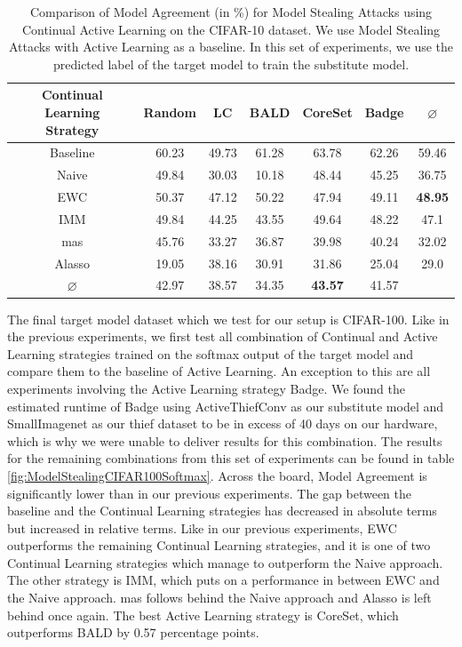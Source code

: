\begin{table}[h]
    \centering
    \begin{tabular}{c | c c c c c | c} 
        \hline
        \diagbox[width=11em]{Active \\ Learning Strategy}{Continual Learning \\ Strategy} & Random & LC & BALD & CoreSet & Badge & $\varnothing$\\ 
        \hline 
        Baseline & 60.23 & 49.73 & 61.28 & 63.78 & 62.26 & 59.46\\
        \hline
        Naive & 49.84 & 30.03 & 10.18 & 48.44 & 45.25 & 36.75\\
        EWC & 50.37 & 47.12 & 50.22 & 47.94 & 49.11 & \textbf{48.95} \\
        IMM & 49.84 & 44.25 & 43.55 & 49.64 & 48.22 & 47.1\\
        \gls{mas} & 45.76 & 33.27 & 36.87 & 39.98 & 40.24 & 32.02\\
        Alasso & 19.05 & 38.16 & 30.91 & 31.86 & 25.04 & 29.0\\
        \hline
        $\varnothing$ & 42.97 & 38.57 & 34.35 & \textbf{43.57} & 41.57\\
        \hline
    \end{tabular}
    \caption{Comparison of Model Agreement (in \%) for Model Stealing Attacks using Continual Active Learning on the CIFAR-10 dataset. We use Model Stealing Attacks with Active Learning as a baseline. In this set of experiments,
    we use the predicted label of the target model to train the substitute model.}
    \label{fig:ModelStealingCIFAR10Label}
\end{table}

The final target model dataset which we test for our setup is CIFAR-100. Like in the previous experiments, we first test all combination of Continual and Active Learning strategies trained on the softmax output of the target model
and compare them to the baseline of Active Learning. An exception to this are all experiments involving the Active Learning strategy Badge. We found the estimated runtime of Badge using ActiveThiefConv as our substitute model and SmallImagenet as our thief dataset
to be in excess of 40 days on our hardware, which is why we were unable to deliver results for this combination. The results for the remaining combinations from this set of experiments can be found in table \ref{fig:ModelStealingCIFAR100Softmax}.
Across the board, Model Agreement is significantly lower than in our previous experiments. The gap between the baseline and the Continual Learning strategies has decreased in absolute terms but increased in relative terms. Like in our previous experiments, EWC outperforms
the remaining Continual Learning strategies, and it is one of two Continual Learning strategies which manage to outperform the Naive approach. The other strategy is IMM, which puts on a performance in between EWC and the Naive approach. \gls{mas} follows behind the Naive approach
and Alasso is left behind once again. The best Active Learning strategy is CoreSet, which outperforms BALD by 0.57 percentage points. \par

